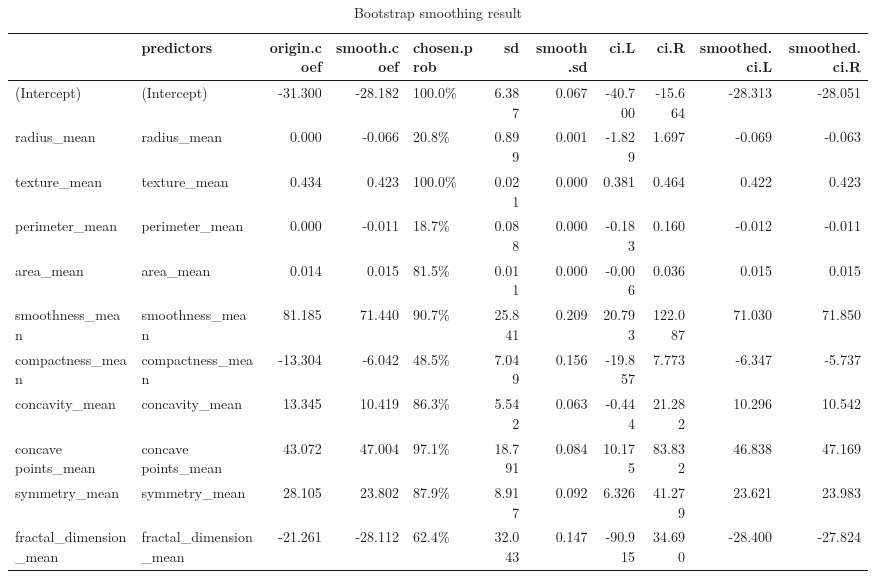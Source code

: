 \documentclass[
]{article}
\begin{document}
\begin{longtable}[t]{llrrlrrrrrr}
\caption{\label{tab:bs_var_reduce}Bootstrap smoothing result}\\
\toprule
 & predictors & origin.coef & smooth.coef & chosen.prob & sd & smooth.sd & ci.L & ci.R & smoothed.ci.L & smoothed.ci.R\\
\midrule
(Intercept) & (Intercept) & -31.300 & -28.182 & 100.0\% & 6.387 & 0.067 & -40.700 & -15.664 & -28.313 & -28.051\\
radius\_mean & radius\_mean & 0.000 & -0.066 & 20.8\% & 0.899 & 0.001 & -1.829 & 1.697 & -0.069 & -0.063\\
texture\_mean & texture\_mean & 0.434 & 0.423 & 100.0\% & 0.021 & 0.000 & 0.381 & 0.464 & 0.422 & 0.423\\
perimeter\_mean & perimeter\_mean & 0.000 & -0.011 & 18.7\% & 0.088 & 0.000 & -0.183 & 0.160 & -0.012 & -0.011\\
area\_mean & area\_mean & 0.014 & 0.015 & 81.5\% & 0.011 & 0.000 & -0.006 & 0.036 & 0.015 & 0.015\\
\addlinespace
smoothness\_mean & smoothness\_mean & 81.185 & 71.440 & 90.7\% & 25.841 & 0.209 & 20.793 & 122.087 & 71.030 & 71.850\\
compactness\_mean & compactness\_mean & -13.304 & -6.042 & 48.5\% & 7.049 & 0.156 & -19.857 & 7.773 & -6.347 & -5.737\\
concavity\_mean & concavity\_mean & 13.345 & 10.419 & 86.3\% & 5.542 & 0.063 & -0.444 & 21.282 & 10.296 & 10.542\\
concave points\_mean & concave points\_mean & 43.072 & 47.004 & 97.1\% & 18.791 & 0.084 & 10.175 & 83.832 & 46.838 & 47.169\\
symmetry\_mean & symmetry\_mean & 28.105 & 23.802 & 87.9\% & 8.917 & 0.092 & 6.326 & 41.279 & 23.621 & 23.983\\
\addlinespace
fractal\_dimension\_mean & fractal\_dimension\_mean & -21.261 & -28.112 & 62.4\% & 32.043 & 0.147 & -90.915 & 34.690 & -28.400 & -27.824\\
\bottomrule
\end{longtable}
\endgroup{}
\end{document}
